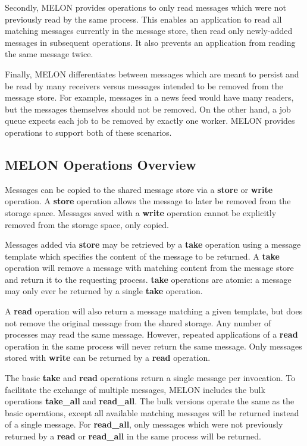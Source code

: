 \documentclass[lnicst]{svmultln}
\begin{document}
Secondly, MELON provides operations to only read messages which were not previously read by the same process. This enables an application to read all matching messages currently in the message store, then read only newly-added messages in subsequent operations. It also prevents an application from reading the same message twice.

Finally, MELON differentiates between messages which are meant to persist and be read by many receivers versus messages intended to be removed from the message store. For example, messages in a news feed would have many readers, but the messages themselves should not be removed. On the other hand, a job queue expects each job to be removed by exactly one worker. MELON provides operations to support both of these scenarios.

\subsection{MELON Operations Overview}

Messages can be copied to the shared message store via a \textbf{store} or \textbf{write} operation. A \textbf{store} operation allows the message to later be removed from the storage space. Messages saved with a \textbf{write} operation cannot be explicitly removed from the storage space, only copied.

Messages added via \textbf{store} may be retrieved by a \textbf{take} operation using a message template which specifies the content of the message to be returned. A \textbf{take} operation will remove a message with matching content from the message store and return it to the requesting process. \textbf{take} operations are atomic: a message may only ever be returned by a single \textbf{take} operation.

A \textbf{read} operation will also return a message matching a given template, but does not remove the original message from the shared storage. Any number of processes may read the same message. However, repeated applications of a \textbf{read} operation in the same process will never return the same message. Only messages stored with \textbf{write} can be returned by a \textbf{read} operation.

The basic \textbf{take} and \textbf{read} operations return a single message per invocation. To facilitate the exchange of multiple messages, MELON includes the bulk operations \textbf{take\_all} and \textbf{read\_all}. The bulk versions operate the same as the basic operations, except all available matching messages will be returned instead of a single message. For \textbf{read\_all}, only messages which were not previously returned by a \textbf{read} or \textbf{read\_all} in the same process will be returned.
\end{document}
